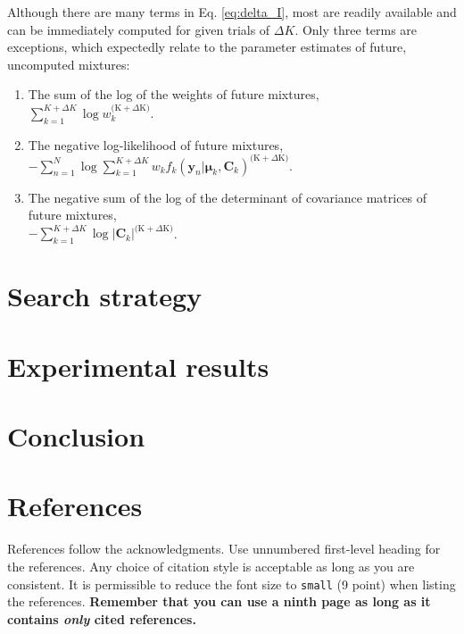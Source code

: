 \documentclass{article}
\newcommand{\vect}[1]{\boldsymbol{\mathbf{#1}}}
\def\veccov{\vect{C}}
\def\vecmean{\vect{\mu}}
\def\weight{w}
\def\datum{y}
\def\data{\vect{\datum}}
\def\future{^{\mathrm{(K} + \Delta\mathrm{K)}}}
\begin{document}
Although there are many terms in Eq. \ref{eq:delta_I}, most are readily
available and can be immediately computed for given trials of $\Delta{K}$.  
Only three terms are exceptions, which expectedly relate to the parameter 
estimates of future, uncomputed mixtures:
\begin{enumerate}
  \item The sum of the log of the weights of future mixtures,\\
        $\sum_{k=1}^{K+\Delta{K}}\log\weight_k\future$.
  \item The negative log-likelihood of future mixtures,\\ $-\sum_{n=1}^{N}\log\sum_{k=1}^{K+\Delta{K}}\weight_{k}f_{k}(\data_n|\vecmean_k,\veccov_k)\future$.
  \item The negative sum of the log of the determinant of covariance matrices
        of future mixtures,\\
        $-\sum_{k=1}^{K + \Delta{K}}\log|\veccov_k|\future$.
\end{enumerate}



\section{Search strategy}




\section{Experimental results}

% 


\section{Conclusion}



\section*{References}

References follow the acknowledgments. Use unnumbered first-level
heading for the references. Any choice of citation style is acceptable
as long as you are consistent. It is permissible to reduce the font
size to \verb+small+ (9 point) when listing the references. {\bf
  Remember that you can use a ninth page as long as it contains
  \emph{only} cited references.}
\medskip
\end{document}
